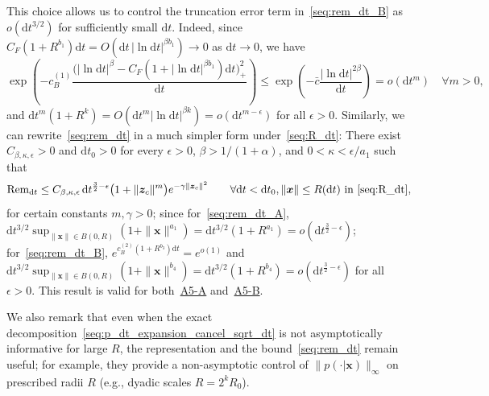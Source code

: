 \documentclass[
 longbibliography,
 twocolumn,
 superscriptaddress,
 amsmath,
 amssymb,
 amsthm,
 amsfonts,
 prl,
 floatfix,
]{revtex4-2}
\begin{document}
\begin{widetext}
This choice allows us to control the truncation error term in~\eqref{seq:rem_dt_B} as $o(\mathrm dt^{3/2})$ for sufficiently small $\mathrm dt$. Indeed, since $C_F(1+R^{b_1})\mathrm dt=O(\mathrm dt\,|\ln\mathrm dt|^{\beta b_1})\rightarrow0$ as $\mathrm dt\rightarrow 0$, we have
\begin{equation*}
    \exp\!\!\left(-c_B^{(1)}\frac{\big(|\ln \mathrm dt|^\beta
    -C_F(1+|\ln \mathrm dt|^{\beta b_1})\mathrm dt
    \big)_+^2}{\mathrm dt}\right)
    \leq \exp\left(-\bar c\frac{|\ln \mathrm dt|^{2\beta}}{\mathrm dt}\right)
    = o(\mathrm dt^m)
    \quad\forall m>0,
\end{equation*}
and $\mathrm dt^m(1+R^k)=O(\mathrm dt^m\mathrm |\ln\mathrm dt|^{\beta k})=o(\mathrm dt^{m-\epsilon})$ for all $\epsilon>0$.
Similarly, we can rewrite~\eqref{seq:rem_dt} in a much simpler form under~\eqref{seq:R_dt}: There exist $C_{\beta,\kappa,\epsilon}>0$ and $\mathrm dt_0>0$ for every $\epsilon>0$, $\beta>1/(1+\alpha)$, and $0<\kappa<\epsilon/a_1$ such that
\begin{equation}
  \mathrm{Rem}_{\mathrm dt}
  \leq C_{\beta,\kappa,\epsilon}\,
  \mathrm dt^{\frac{3}{2}-\epsilon}
  \big(1+\|\bm z_c\|^m\big)
  e^{-\gamma\|\bm z_c\|^2}
  \qquad\forall
  \mathrm dt<\mathrm dt_0,
  \|\bm x\|\leq R(\mathrm dt)\text{ in~\eqref{seq:R_dt}},
  \label{seq:rem_dt_Rdt_choosen}
\end{equation}
for certain constants $m,\gamma>0$; since for~\eqref{seq:rem_dt_A}, $\mathrm dt^{3/2}\sup_{\|\bm x\|\in B(0,R)}(1+\|\bm x\|^{a_1})=\mathrm dt^{3/2}(1+R^{a_1})=o(\mathrm dt^{\frac{3}{2}-\epsilon})$;
for~\eqref{seq:rem_dt_B}, $e^{c_{B}^{(2)}(1+R^{b_3})\mathrm dt}=e^{o(1)}$ and $\mathrm dt^{3/2}\sup_{\|\bm x\|\in B(0,R)}(1+\|\bm x\|^{b_4})=\mathrm dt^{3/2}(1+R^{b_4})=o(\mathrm dt^{\frac{3}{2}-\epsilon})$ for all $\epsilon>0$. This result is valid for both~\hyperlink{assumption:A5-A}{A5-A} and~\hyperlink{assumption:A5-B}{A5-B}. 

We also remark that even when the exact decomposition~\eqref{seq:p_dt_expansion_cancel_sqrt_dt} is not asymptotically informative for large $R$, the representation and the bound~\eqref{seq:rem_dt} remain useful; for example, they provide a non-asymptotic control of $\|p(\cdot|\bm x)\|_\infty$ on prescribed radii $R$ (e.g., dyadic scales $R=2^k R_0$).


\end{widetext}
\end{document}
